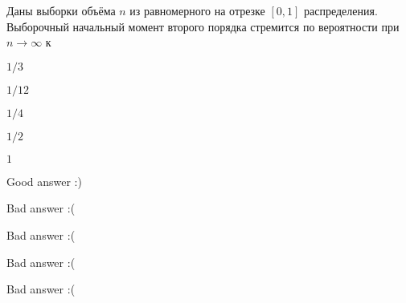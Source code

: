
\begin{question}
Даны выборки объёма \(n\) из равномерного на отрезке \([0,1]\)
распределения. Выборочный начальный момент второго порядка стремится по
вероятности при \(n \stackrel{}{\to} \infty\) к
\begin{answerlist}
  \item \(1/3\)
  \item \(1/12\)
  \item \(1/4\)
  \item \(1/2\)
  \item \(1\)
\end{answerlist}
\end{question}

\begin{solution}
\begin{answerlist}
  \item Good answer :)
  \item Bad answer :(
  \item Bad answer :(
  \item Bad answer :(
  \item Bad answer :(
\end{answerlist}
\end{solution}

